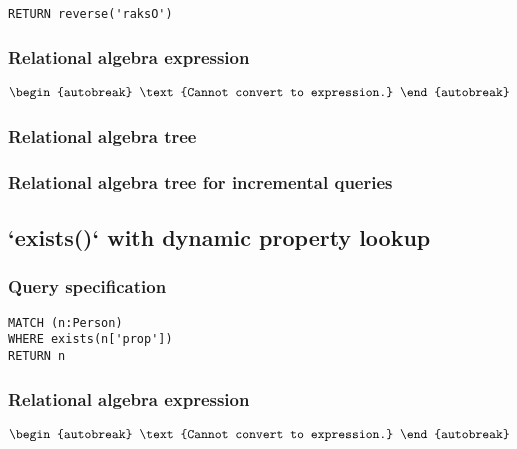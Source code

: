 \begin{lstlisting}
RETURN reverse('raksO')
\end{lstlisting}

\subsubsection*{Relational algebra expression}

\begin{align*}
\begin{autobreak}
\text{Cannot convert to expression.}
\end{autobreak}
\end{align*}

\subsubsection*{Relational algebra tree}


\subsubsection*{Relational algebra tree for incremental queries}


\subsection{`exists()` with dynamic property lookup}

\subsubsection*{Query specification}

\begin{lstlisting}
MATCH (n:Person)
WHERE exists(n['prop'])
RETURN n
\end{lstlisting}

\subsubsection*{Relational algebra expression}

\begin{align*}
\begin{autobreak}
\text{Cannot convert to expression.}
\end{autobreak}
\end{align*}

